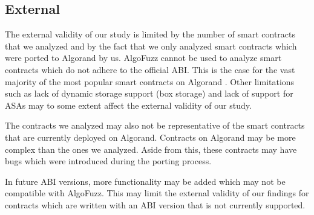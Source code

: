 \subsection*{External}
The external validity of our study is limited by the number of smart contracts that we analyzed and by the fact that we only analyzed smart contracts which were ported to Algorand by us.
AlgoFuzz cannot be used to analyze smart contracts which do not adhere to the official \ac{ABI}.
This is the case for the vast majority of the most popular smart contracts on Algorand \cite{noauthor_algorand_nodate-6}.
Other limitations such as lack of dynamic storage support (box storage) and lack of support for \acp{ASA} may to some extent affect the external validity of our study.

The contracts we analyzed may also not be representative of the smart contracts that are currently deployed on Algorand.
Contracts on Algorand may be more complex than the ones we analyzed.
Aside from this, these contracts may have bugs which were introduced during the porting process.

In future \ac{ABI} versions, more functionality may be added which may not be compatible with AlgoFuzz.
This may limit the external validity of our findings for contracts which are written with an \ac{ABI} version that is not currently supported.